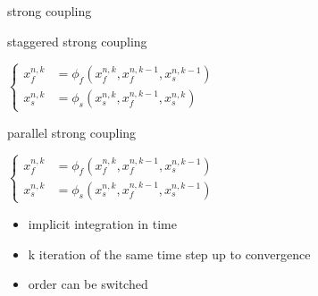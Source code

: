 \documentclass[10pt,t]{beamer}
\begin{document}
\begin{frame}{strong coupling}
  
  \begin{block}{staggered strong coupling}
  \begin{center}
  $
  \left\{
    \begin{aligned}
        x_f^{n,k}&=\phi_f\left(x_f^{n,k},x_f^{n,k-1},x_s^{n,k-1} \right) \\
        x_s^{n,k}&=\phi_s\left(x_s^{n,k},x_f^{n,k-1},x_s^{n,k} \right)
    \end{aligned}
    \right.
  $
      
  \end{center}
  \end{block}  

  
  \begin{block}{parallel strong coupling}
  \begin{center}
  $
  \left\{
    \begin{aligned}
        x_f^{n,k}&=\phi_f\left(x_f^{n,k},x_f^{n,k-1},x_s^{n,k-1} \right) \\
        x_s^{n,k}&=\phi_s\left(x_s^{n,k},x_f^{n,k-1},x_s^{n,k-1} \right)
    \end{aligned}
    \right.
  $
  \end{center}
  \end{block}  

\begin{itemize}
    \item implicit integration in time
    \item k iteration of the same time step up to convergence
    \item order can be switched
\end{itemize}


  \hyperlink{coupling}{}
\end{frame}
\end{document}

